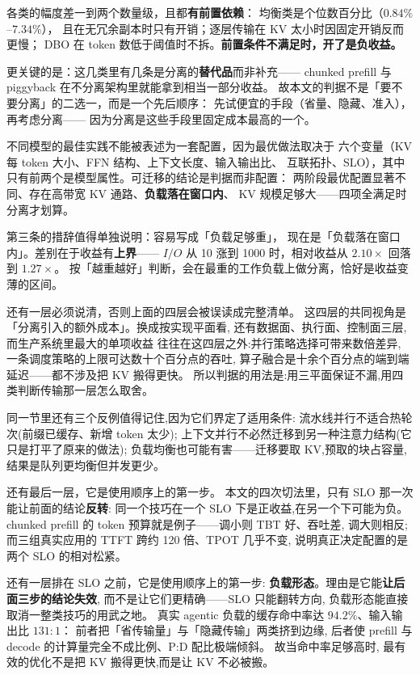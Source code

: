 各类的幅度差一到两个数量级，且都\textbf{有前置依赖}：
均衡类是个位数百分比（$0.84\%$--$7.34\%$），
且在无冗余副本时只有开销；逐层传输在 KV 太小时因固定开销反而更慢；
DBO 在 token 数低于阈值时不拆。\textbf{前置条件不满足时，开了是负收益。}

更关键的是：这几类里有几条是分离的\textbf{替代品}而非补充——
chunked prefill 与 piggyback 在不分离架构里就能拿到相当一部分收益。
故本文的判据不是「要不要分离」的二选一，而是一个先后顺序：
先试便宜的手段（省量、隐藏、准入），再考虑分离——
因为分离是这些手段里固定成本最高的一个。

不同模型的最佳实践不能被表述为一套配置，因为最优做法取决于
六个变量（KV 每 token 大小、FFN 结构、上下文长度、输入输出比、
互联拓扑、SLO），其中只有前两个是模型属性。可迁移的结论是判据而非配置：
两阶段最优配置显著不同、存在高带宽 KV 通路、\textbf{负载落在窗口内}、
KV 规模足够大——四项全满足时分离才划算。

第三条的措辞值得单独说明：容易写成「负载足够重」，
现在是「负载落在窗口内」。差别在于收益有\textbf{上界}——
$I/O$ 从 10 涨到 1000 时，相对收益从 $2.10\times$ 回落到 $1.27\times$。
按「越重越好」判断，会在最重的工作负载上做分离，恰好是收益变薄的区间。


还有一层必须说清，否则上面的四层会被误读成完整清单。
这四层的共同视角是「分离引入的额外成本」。换成按实现平面看,
还有数据面、执行面、控制面三层,而生产系统里最大的单项收益
往往在这四层之外:并行策略选择可带来数倍差异,
一条调度策略的上限可达数十个百分点的吞吐,
算子融合是十余个百分点的端到端延迟——都不涉及把 KV 搬得更快。
所以判据的用法是:用三平面保证不漏,用四类判断传输那一层怎么取舍。

同一节里还有三个反例值得记住,因为它们界定了适用条件:
流水线并行不适合热轮次(前缀已缓存、新增 token 太少);
上下文并行不必然迁移到另一种注意力结构(它只是打平了原来的做法);
负载均衡也可能有害——迁移要取 KV,预取的块占容量,
结果是队列更均衡但并发更少。

还有最后一层，它是使用顺序上的第一步。
本文的四次切法里，只有 SLO 那一次能让前面的结论\textbf{反转}:
同一个技巧在一个 SLO 下是正收益,在另一个下可能为负。
chunked prefill 的 token 预算就是例子——调小则 TBT 好、吞吐差,
调大则相反;而三组真实应用的 TTFT 跨约 120 倍、TPOT 几乎不变,
说明真正决定配置的是两个 SLO 的相对松紧。

还有一层排在 SLO 之前，它是使用顺序上的第一步:
\textbf{负载形态}。理由是它能\textbf{让后面三步的结论失效},
而不是让它们更精确——SLO 只能翻转方向,
负载形态能直接取消一整类技巧的用武之地。
真实 agentic 负载的缓存命中率达 $94.2\%$、输入输出比 $131:1$：
前者把「省传输量」与「隐藏传输」两类挤到边缘,
后者使 prefill 与 decode 的计算量完全不成比例、P:D 配比极端倾斜。
故当命中率足够高时,
最有效的优化不是把 KV 搬得更快,而是让 KV 不必被搬。

